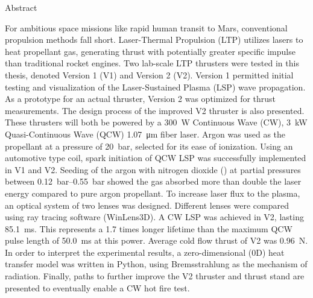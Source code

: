 \begin{plainchp}{Abstract}
    
    For ambitious space missions like rapid human transit to Mars, conventional propulsion methods fall short. Laser-Thermal Propulsion (LTP) utilizes lasers to heat propellant gas, generating thrust with potentially greater specific impulse than traditional rocket engines. Two lab-scale LTP thrusters were tested in this thesis, denoted Version 1 (V1) and Version 2 (V2). Version 1 permitted initial testing and visualization of the Laser-Sustained Plasma (LSP) wave propagation. As a prototype for an actual thruster, Version 2 was optimized for thrust measurements. The design process of the improved V2 thruster is also presented. These thrusters will both be powered by a \qty{300}{W} Continuous Wave (CW), \qty{3}{kW} Quasi-Continuous Wave (QCW) \qty{1.07}{μm} fiber laser. Argon was used as the propellant at a pressure of \qty{20}{bar}, selected for its ease of ionization. Using an automotive type coil, spark initiation of QCW LSP was successfully implemented in V1 and V2. Seeding of the argon with nitrogen dioxide () at partial pressures between \qtyrange{.12}{.55}{bar} showed the gas absorbed more than double the laser energy compared to pure argon propellant. To increase laser flux to the plasma, an optical system of two lenses was designed. Different lenses were compared using ray tracing software (WinLens3D). A CW LSP was achieved in V2, lasting \qty{85.1}{ms}. This represents a 1.7 times longer lifetime than the maximum QCW pulse length of \qty{50.0}{ms} at this power. Average cold flow thrust of V2 was \qty{0.96}{N}. In order to interpret the experimental results, a zero-dimensional (0D) heat transfer model was written in Python, using Bremsstrahlung as the mechanism of radiation. Finally, paths to further improve the V2 thruster and thrust stand are presented to eventually enable a CW hot fire test.

\end{plainchp}